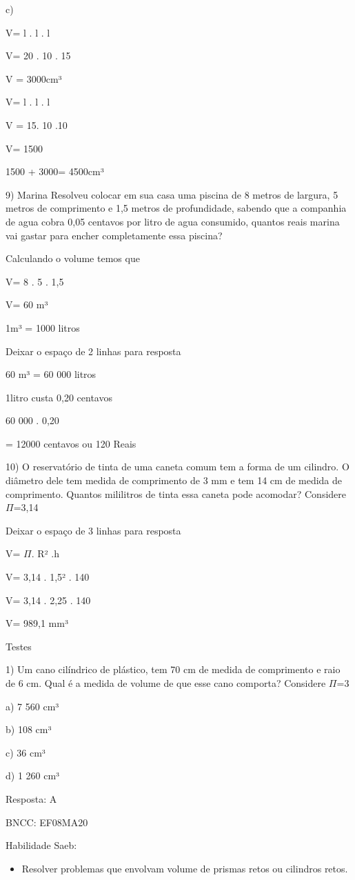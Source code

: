 c)

V= l . l . l

V= 20 . 10 . 15

V = 3000cm³

V= l . l . l

V = 15. 10 .10

V= 1500

1500 + 3000= 4500cm³

9) Marina Resolveu colocar em sua casa uma piscina de 8 metros de
largura, 5 metros de comprimento e 1,5 metros de profundidade, sabendo
que a companhia de agua cobra 0,05 centavos por litro de agua consumido,
quantos reais marina vai gastar para encher completamente essa piscina?

Calculando o volume temos que

V= 8 . 5 . 1,5

V= 60 m³

1m³ = 1000 litros

Deixar o espaço de 2 linhas para resposta

60 m³ = 60 000 litros

1litro custa 0,20 centavos

60 000 . 0,20

= 12000 centavos ou 120 Reais

10) O reservatório de tinta de uma caneta comum tem a forma de um
cilindro. O diâmetro dele tem medida de comprimento de 3 mm e tem 14 cm
de medida de comprimento. Quantos mililitros de tinta essa caneta pode
acomodar? Considere \(\Pi\)=3,14

Deixar o espaço de 3 linhas para resposta

V= \(\Pi\). R² .h

V= 3,14 . 1,5² . 140

V= 3,14 . 2,25 . 140

V= 989,1 mm³

Testes

1) Um cano cilíndrico de plástico, tem 70 cm de medida de comprimento e
raio de 6 cm. Qual é a medida de volume de que esse cano comporta?
Considere \(\Pi\)=3

a) 7 560 cm³

b) 108 cm³

c) 36 cm³

d) 1 260 cm³

Resposta: A

BNCC: EF08MA20

Habilidade Saeb:

\begin{itemize}
\tightlist
\item
  Resolver problemas que envolvam volume de prismas retos ou cilindros
  retos.
\end{itemize}

